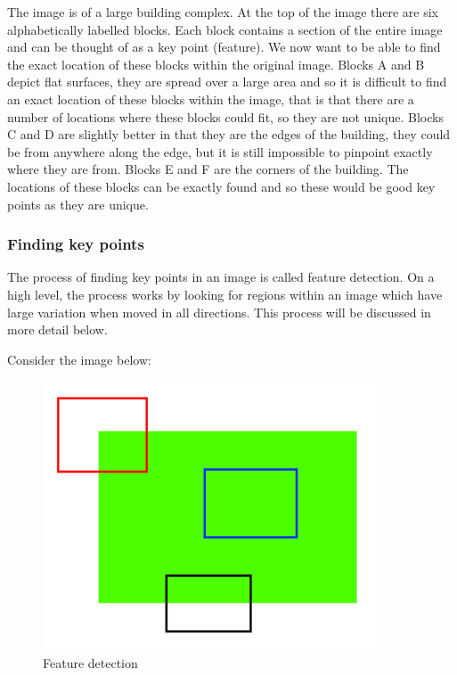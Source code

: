 \documentclass[11pt,a4paper]{report}
\begin{document}
				The image is of a large building complex. At the top of the image there are six alphabetically labelled blocks. Each block contains a section of the entire image and can be thought of as a key point (feature). We now want to be able to find the exact location of these blocks within the original image. 
				Blocks A and B depict flat surfaces, they are spread over a large area and so it is difficult to find an exact location of these blocks within the image, that is that there are a number of locations where these blocks could fit, so they are not unique.
				Blocks C and D are slightly better in that they are the edges of the building, they could be from anywhere along the edge, but it is still impossible to pinpoint exactly where they are from.
				Blocks E and F are the corners of the building. The locations of these blocks can be exactly found and so these would be good key points as they are unique.
			
			\subsubsection{Finding key points}
				The process of finding key points in an image is called feature detection. On a high level, the process works by looking for regions within an image which have large variation when moved in all directions. This process will be discussed in more detail below.
				
				Consider the image below:
				
				\begin{figure}[H]
					\centering
					\includegraphics[width=0.9\textwidth]{feature_detection}
					\caption{Feature detection}
				\end{figure}
				
\end{document}
